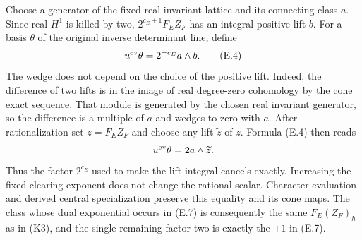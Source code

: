 Choose a generator of the fixed real invariant lattice and its
connecting class $a$. Since real $H^1$ is killed by two,
$2^{c_E+1}F_EZ_F$ has an integral positive lift $b$.
For a basis $\theta$ of the original inverse determinant line, define
\[
                         u^{\rm ev}\theta=2^{-c_E}a\wedge b.
 \tag{E.4}
\]
The wedge does not depend on the choice of the positive lift.
Indeed, the difference of two lifts is in the image of real
degree-zero cohomology by the cone exact sequence. That module
is generated by the chosen real invariant generator, so the
difference is a multiple of $a$ and wedges to zero with $a$.
After rationalization set $z=F_EZ_F$ and choose any lift
$\widetilde z$ of $z$. Formula (E.4) then reads
\[
              u^{\rm ev}\theta=2a\wedge\widetilde z.
\]
Thus the factor $2^{c_E}$ used to make the lift integral cancels
exactly. Increasing the fixed clearing exponent does not change
the rational scalar. Character evaluation and derived central
specialization preserve this equality and its cone maps. The
class whose dual exponential occurs in (E.7) is consequently
the same $F_E(Z_F)_h$ as in (K3), and the single remaining factor
two is exactly the $+1$ in (E.7).


